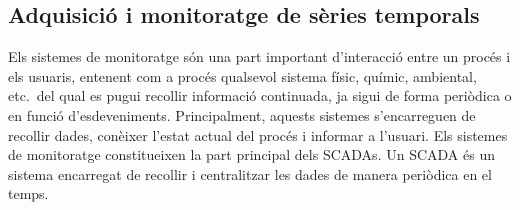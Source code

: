











\subsection{Adquisició i monitoratge de sèries temporals}

Els sistemes de monitoratge són una part important d'interacció entre
un procés i els usuaris, entenent com a procés qualsevol sistema
físic, químic, ambiental, etc.\ del qual es pugui recollir informació
continuada, ja sigui de forma periòdica o en funció
d'esdeveniments. Principalment, aquests sistemes s'encarreguen de
recollir dades, conèixer l'estat actual del procés i informar a
l'usuari. Els sistemes de monitoratge constitueixen la part principal
dels \glspl{SCADA}. Un \gls{SCADA} és un sistema encarregat de recollir i
centralitzar les dades de manera periòdica en el temps.



